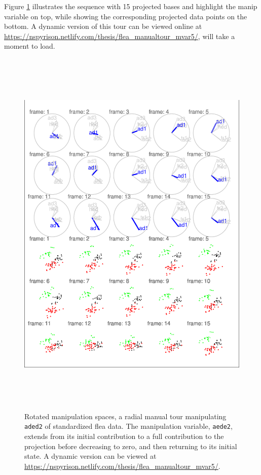 \documentclass{monashthesis}
\begin{document}
Figure \ref{fig:step3} illustrates the sequence with 15 projected bases
and highlight the manip variable on top, while showing the corresponding
projected data points on the bottom. A dynamic version of this tour can
be viewed online at
\url{https://nspyrison.netlify.com/thesis/flea_manualtour_mvar5/}, will
take a moment to load.








\begin{figure}

{\centering \includegraphics[width=6in,height=7.2in]{thesis_files/figure-latex/step3-1} 

}

\caption{Rotated manipulation spaces, a radial manual tour
manipulating \texttt{aded2} of standardized flea data. The manipulation
variable, \texttt{aede2}, extends from its initial contribution to a
full contribution to the projection before decreasing to zero, and then
returning to its initial state. A dynamic version can be viewed at
\url{https://nspyrison.netlify.com/thesis/flea_manualtour_mvar5/}.}\label{fig:step3}
\end{figure}
\end{document}
